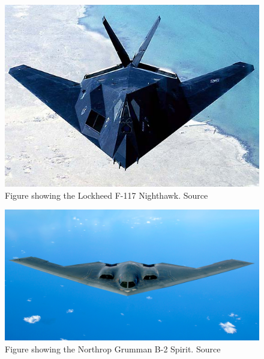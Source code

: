 \documentclass[12pt]{article}
\begin{document}
\newpage
\begin{multicols}{2}
\begin{figure}[H]
\centering
\includegraphics[scale=0.35]{Images/F-117.jpg}
\caption{Figure showing the Lockheed F-117 Nighthawk. Source \cite{F117}}
\label{F117}
\end{figure}

\begin{figure}[H]
\centering
\includegraphics[scale=0.13]{Images/B-2.jpg}
\caption{Figure showing the Northrop Grumman B-2 Spirit. Source \cite{B-2}}
\label{B-2}
\end{figure}
\end{multicols}
\end{document}
